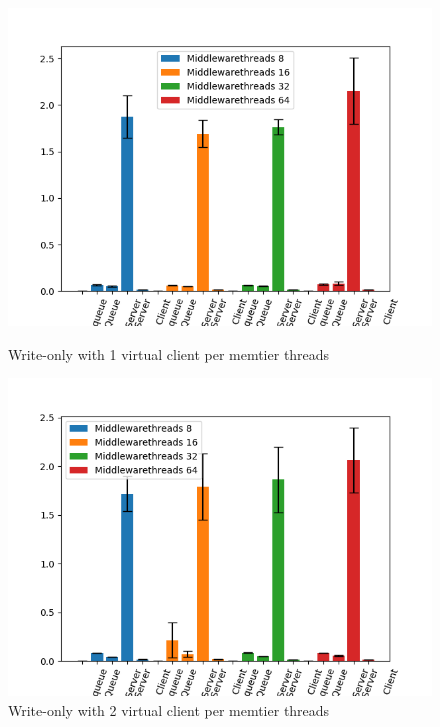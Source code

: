\documentclass[11pt,a4paper]{article}
\begin{document}
\begin{figure}[H] 
  \label{ fig7} 
  \begin{minipage}[b]{0.5\linewidth}
    \centering
    \includegraphics[width=0.9\linewidth]{img/exp4_1/exp4_1_mw_percentile_plots_writes_1__vc_1.png} 
    \caption{Write-only with 1 virtual client per memtier threads} 
    \vspace{4ex}
  \end{minipage}%
  \begin{minipage}[b]{0.5\linewidth}
    \centering
    \includegraphics[width=0.9\linewidth]{img/exp4_1/exp4_1_mw_percentile_plots_writes_1__vc_2.png} 
    \caption{Write-only with 2 virtual client per memtier threads} 
    \vspace{4ex}
  \end{minipage} 
  \begin{minipage}[b]{0.5\linewidth}

\end{minipage}
\end{figure}
\end{document}
